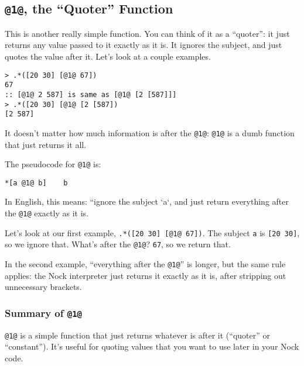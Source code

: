 \documentclass[twoside]{article}
\begin{document}
\subsection{\lstinline[style=inlinecode]{@1@}, the “Quoter” Function}
\label{sxn:nock1}

This is another really simple function. You can think of it as a “quoter”: it just returns any value passed to it exactly as it is. It ignores the subject, and just quotes the value after it. Let's look at a couple examples.

\begin{lstlisting}[style=listingblock]
> .*([20 30] [@1@ 67])
67
:: [@1@ 2 587] is same as [@1@ [2 [587]]]
> .*([20 30] [@1@ [2 [587])
[2 587]
\end{lstlisting}

It doesn't matter how much information is after the \lstinline[style=inlinecode]{@1@}: \lstinline[style=inlinecode]{@1@} is a dumb function that just returns it all.

The pseudocode for \lstinline[style=inlinecode]{@1@} is:

\begin{lstlisting}[style=listingcode]
*[a @1@ b]    b
\end{lstlisting}

In English, this means: ``ignore the subject `a`, and just return everything after the \lstinline[style=inlinecode]{@1@} exactly as it is.

Let's look at our first example, \lstinline[style=inlinecode]{.*([20 30] [@1@ 67])}. The subject \lstinline[style=inlinecode]{a} is \lstinline[style=inlinecode]{[20 30]}, so we ignore that. What's after the \lstinline[style=inlinecode]{@1@}? \lstinline[style=inlinecode]{67}, so we return that.

In the second example, “everything after the \lstinline[style=inlinecode]{@1@}” is longer, but the same rule applies: the Nock interpreter just returns it exactly as it is, after stripping out unnecessary brackets.

\subsubsection{Summary of \lstinline[style=inlinecode]{@1@}}

\lstinline[style=inlinecode]{@1@} is a simple function that just returns whatever is after it (“quoter” or “constant”). It's useful for quoting values that you want to use later in your Nock code.
\end{document}
